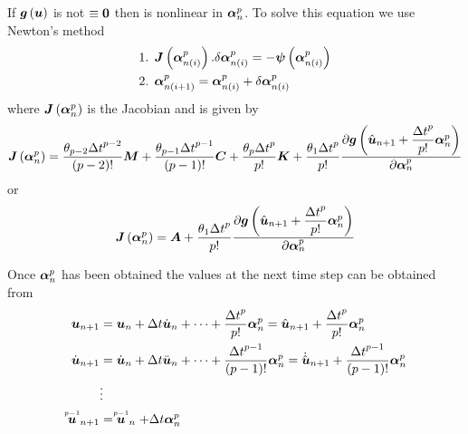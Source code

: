 If $\fnof{\vect{g}}{\vect{u}}$ is not $\equiv\vect{0}$ then
 is nonlinear in $\vect{\alpha}^{p}_{n}$. To solve this
equation we use Newton's method \ie
\begin{equation}
  \begin{split}
    \text{1.  } & \fnof{\matr{J}}{\vect{\alpha}^{p}_{n(i)}}.\delta
    \vect{\alpha}^{p}_{n(i)} = 
    -\fnof{\vect{\psi}}{\vect{\alpha}^{p}_{n(i)}} \\
    \text{2.  } & \vect{\alpha}^{p}_{n(i+1)}=\vect{\alpha}^{p}_{n(i)}+\delta
    \vect{\alpha}^{p}_{n(i)}
  \end{split}
\end{equation}
where $\fnof{\matr{J}}{\vect{\alpha}^{p}_{n}}$ is the Jacobian and is given by
\begin{equation}
  \fnof{\matr{J}}{\vect{\alpha}^{p}_{n}}=\dfrac{\theta_{p-2}{\Delta t}^{p-2}}{\factorial{p-2}}\matr{M}+
  \dfrac{\theta_{p-1}{\Delta
      t}^{p-1}}{\factorial{p-1}}\matr{C}+\dfrac{\theta_{p}{\Delta t}^{p}}{p!}\matr{K}+
  \dfrac{\theta_{1}{\Delta t}^{p}}{p!}
  \delby{\fnof{\vect{g}}{\hat{\vect{u}}_{n+1}+\dfrac{{\Delta
          t}^{p}}{p!}
      \vect{\alpha}^{p}_{n}}}{\vect{\alpha}^{p}_{n}}
\end{equation}
or
\begin{equation}
  \fnof{\matr{J}}{\vect{\alpha}^{p}_{n}}=\matr{A}+\dfrac{\theta_{1}{\Delta
      t}^{p}}{p!}
  \delby{\fnof{\vect{g}}{\hat{\vect{u}}_{n+1}+\dfrac{{\Delta t}^{p}}{p!}\vect{\alpha}^{p}_{n}}}{\vect{\alpha}^{p}_{n}}
\end{equation}

Once $\vect{\alpha}^{p}_{n}$ has been obtained the values at the next time step can be obtained from
\begin{equation}
  \begin{split}
    \vect{u}_{n+1} &= \vect{u}_{n}+\Delta t
    \dot{\vect{u}}_{n}+\cdots+\dfrac{{\Delta
        t}^{p}}{p!}\vect{\alpha}^{p}_{n}=\hat{\vect{u}}_{n+1}+
    \dfrac{{\Delta t}^{p}}{p!}\vect{\alpha}^{p}_{n}\\
    \dot{\vect{u}}_{n+1} &= \dot{\vect{u}}_{n}+\Delta t
    \ddot{\vect{u}}_{n}+\cdots+\dfrac{{\Delta
        t}^{p-1}}{\factorial{p-1}}\vect{\alpha}^{p}_{n}=\dot{\hat{\vect{u}}}_{n+1}+\dfrac{{\Delta
        t}^{p-1}}{\factorial{p-1}}\vect{\alpha}^{p}_{n} \\
    &\vdots \\
    \symover{p-1}{\vect{u}}_{n+1} &= \symover{p-1}{\vect{u}}_{n}+\Delta t\vect{\alpha}^{p}_{n}
  \end{split}
\end{equation}


